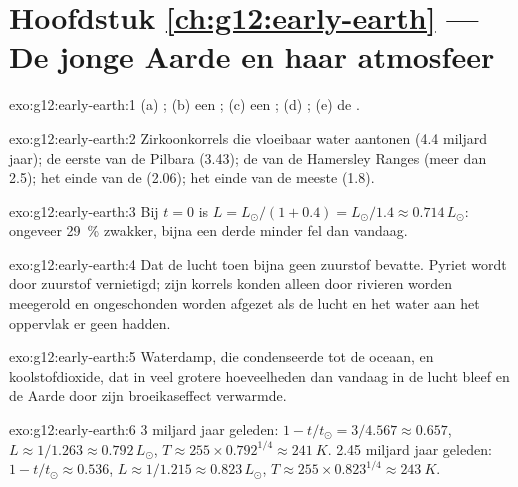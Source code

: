 \section*{Hoofdstuk \ref{ch:g12:early-earth} --- De jonge Aarde en haar atmosfeer}

\begin{solution}{exo:g12:early-earth:1}
(a) ; (b) een ; (c) een ; (d) ; (e) de .
\end{solution}

\begin{solution}{exo:g12:early-earth:2}
Zirkoonkorrels die vloeibaar water aantonen (4.4 miljard jaar); de eerste 
van de Pilbara (3.43); de  van de Hamersley Ranges (meer dan
2.5); het einde van de  (2.06); het einde van de meeste  (1.8).
\end{solution}

\begin{solution}{exo:g12:early-earth:3}
Bij $t = 0$ is $L = L_\odot/(1 + 0.4) = L_\odot/1.4 \approx 0.714\,L_\odot$:
ongeveer \qty{29}{\percent} zwakker, bijna een derde minder fel dan vandaag.
\end{solution}

\begin{solution}{exo:g12:early-earth:4}
Dat de lucht toen bijna geen zuurstof bevatte. Pyriet wordt door zuurstof vernietigd;
zijn korrels konden alleen door rivieren worden meegerold en ongeschonden worden afgezet als
de lucht en het water aan het oppervlak er geen hadden.
\end{solution}

\begin{solution}{exo:g12:early-earth:5}
Waterdamp, die condenseerde tot de oceaan, en koolstofdioxide, dat
in veel grotere hoeveelheden dan vandaag in de lucht bleef en de Aarde door
zijn broeikaseffect verwarmde.
\end{solution}

\begin{solution}{exo:g12:early-earth:6}
3 miljard jaar geleden: $1 - t/t_\odot = 3/4.567 \approx 0.657$, $L \approx
1/1.263 \approx 0.792\,L_\odot$, $T \approx 255 \times 0.792^{1/4} \approx
\qty{241}{K}$. 2.45 miljard jaar geleden: $1 - t/t_\odot \approx 0.536$, $L
\approx 1/1.215 \approx 0.823\,L_\odot$, $T \approx 255 \times 0.823^{1/4}
\approx \qty{243}{K}$.
\end{solution}

